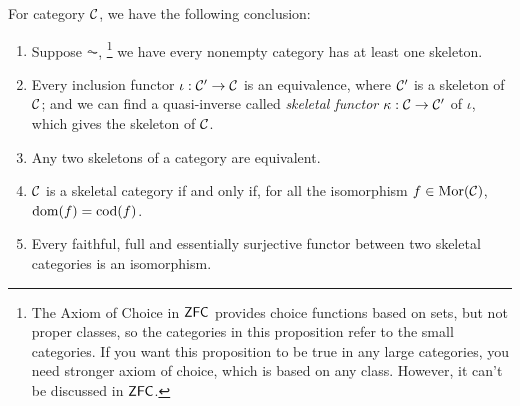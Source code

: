 \documentclass{article}
\begin{document}
\begin{lmm}\label{l4}
	For category $\mathcal{C}$, we have the following conclusion:
	\begin{enumerate}
		\item Suppose $\AC$,
			\footnote{The Axiom of Choice in $\mathsf{ZFC}$ provides choice functions based on sets, but not proper classes, so the categories in this proposition refer to the small categories. If you want this proposition to be true in any large categories, you need stronger axiom of choice, which is based on any class. However, it can't be discussed in $\mathsf{ZFC}$.}
			we have every nonempty category has at least one skeleton.
		\item Every inclusion functor $\iota:\mathcal{C}'\to\mathcal{C}$ is an equivalence, where $\mathcal{C}'$ is a skeleton of $\mathcal{C}$; and we can find a quasi-inverse called \emph{skeletal functor} $\kappa:\mathcal{C}\to\mathcal{C}'$ of $\iota$, which gives the skeleton of $\mathcal{C}$.
		\item Any two skeletons of a category are equivalent.
		\item $\mathcal{C}$ is a skeletal category if and only if, for all the isomorphism $f\in\mathrm{Mor}(\mathcal{C})$, $\mathrm{dom}(f)=\mathrm{cod}(f)$.
		\item Every faithful, full and essentially surjective functor between two skeletal categories is an isomorphism.
	\end{enumerate}
\end{lmm}
\end{document}
